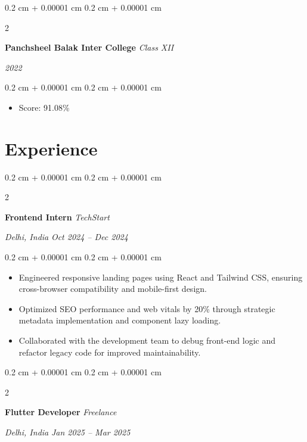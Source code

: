 \documentclass[10pt, a4paper]{article}
\newenvironment{highlights}{
    \begin{itemize}[
        topsep=0.10 cm,
        parsep=0.10 cm,
        partopsep=0pt,
        itemsep=0pt,
        leftmargin=0.4 cm + 10pt
    ]
}{
    \end{itemize}
} %
\newenvironment{onecolentry}{
    \begin{adjustwidth}{
        0.2 cm + 0.00001 cm
    }{
        0.2 cm + 0.00001 cm
    }
}{
    \end{adjustwidth}
} %
\newenvironment{twocolentry}[2][]{
    \onecolentry
    \def\secondColumn{#2}
    \setcolumnwidth{\fill, 4.5 cm}
    \begin{paracol}{2}
}{
    \switchcolumn \raggedleft \secondColumn
    \end{paracol}
    \endonecolentry
} %
\begin{document}
    \begin{twocolentry}{
        \textit{2022}
    }
    \textbf{Panchsheel Balak Inter College}
    \textit{Class XII}
    \end{twocolentry}
    \vspace{0.10 cm}
    \begin{onecolentry}
    \begin{highlights}
        \item Score: 91.08\%
    \end{highlights}
    \end{onecolentry}
    

    \section{Experience}

        \begin{twocolentry}{
            \textit{Delhi, India}    
            \textit{Oct 2024 -- Dec 2024}
        }
        \textbf{Frontend Intern}
        \textit{TechStart}
        \end{twocolentry}

        \vspace{0.10 cm}
        \begin{onecolentry}
        \begin{highlights}
            \item Engineered responsive landing pages using React and Tailwind CSS, ensuring cross-browser compatibility and mobile-first design.
\item Optimized SEO performance and web vitals by 20\% through strategic metadata implementation and component lazy loading.
\item Collaborated with the development team to debug front-end logic and refactor legacy code for improved maintainability.
        \end{highlights}
        \end{onecolentry}
        \vspace{0.2 cm}
        

        \begin{twocolentry}{
            \textit{Delhi, India}    
            \textit{Jan 2025 -- Mar 2025}
        }
        \textbf{Flutter Developer}
        \textit{Freelance}
        \end{twocolentry}
\end{document}
